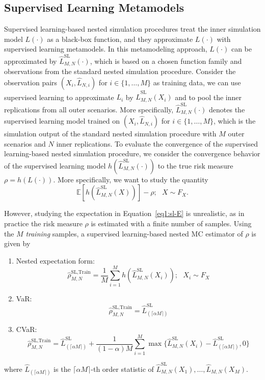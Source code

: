 \subsection{Supervised Learning Metamodels}

Supervised learning-based nested simulation procedures treat the inner simulation model $L(\cdot)$ as a black-box function, and they approximate $L(\cdot)$ with supervised learning metamodels.
In this metamodeling approach, $L(\cdot)$ can be approximated by $\hat{L}^{\text{SL}}_{M, N}(\cdot)$, which is based on a chosen function family and observations from the standard nested simulation procedure.
Consider the observation pairs $(X_i, \hat{L}_{N, i})$ for $i \in \{1, \dots, M\}$ as training data, we can use supervised learning to approximate $L_i$ by $\hat{L}_{M, N}^{\text{SL}}(X_i)$ and to pool the inner replications from all outer scenarios.
More specifically, $\hat{L}^{\text{SL}}_{M, N}(\cdot)$ denotes the supervised learning model trained on $(X_i, \hat{L}_{N, i})$ for $i \in \{1, \dots, M\}$, which is the simulation output of the standard nested simulation procedure with $M$ outer scenarios and $N$ inner replications. 
To evaluate the convergence of the supervised learning-based nested simulation procedure, we consider the convergence behavior of the supervised learning model $h(\hat{L}^{\text{SL}}_{M, N}(\cdot))$ to the true risk measure $\rho = h(L(\cdot))$.
More specifically, we want to study the quantity
\begin{equation} \label{eq1:sl-E}
    \mathbb{E} \left[ h(\hat{L}^{\text{SL}}_{M, N}(X))   \right] - \rho; ~~~ X \sim F_X.
\end{equation}

However, studying the expectation in Equation~\ref{eq1:sl-E} is unrealistic, as in practice the risk measure $\rho$ is estimated with a finite number of samples.
Using the $M$ \textit{training} samples, a supervised learning-based nested MC estimator of $\rho$ is given by

\begin{enumerate}
    \item   Nested expectation form:
            \begin{equation} \label{eq1:sl-train}
                \hat{\rho}^{\text{SL}, \text{Train}}_{M, N} = \frac{1}{M} \sum_{i=1}^M h(\hat{L}^{\text{SL}}_{M, N}(X_i)); ~~~ X_i \sim F_X
            \end{equation}
    \item   VaR:
            $$\hat{\rho}^{\text{SL}, \text{Train}}_{M, N} = \hat{L}^{\text{SL}}_{(\lceil \alpha M \rceil)}$$
    \item   CVaR:
            $$\hat{\rho}^{\text{SL}, \text{Train}}_{M, N} = \hat{L}^{\text{SL}}_{(\lceil \alpha M \rceil)} + \frac{1}{(1-\alpha) M} \sum_{i=1}^M \max \{\hat{L}^{\text{SL}}_{M, N}(X_i) - \hat{L}^{\text{SL}}_{(\lceil \alpha M \rceil)}, 0 \}$$
\end{enumerate}
where $\hat{L}_{(\lceil \alpha M \rceil)}$ is the $\lceil \alpha M \rceil$-th order statistic of $\hat{L}^{\text{SL}}_{M, N}(X_1), \dots, \hat{L}_{M, N}(X_M)$.

